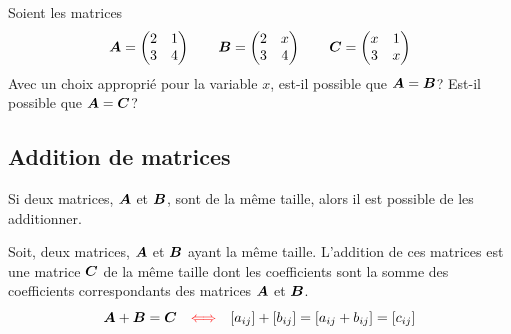 \begin{exerciceB}
Soient les matrices
    \[
    \boldsymbol{A} = \begin{pmatrix}
        2 & 1 \\
        3 & 4
        \end{pmatrix}
    \qquad
    \boldsymbol{B} = \begin{pmatrix}
        2 & x \\
        3 & 4
        \end{pmatrix}
        \qquad
    \boldsymbol{C} = \begin{pmatrix}
        x & 1 \\
        3 & x
        \end{pmatrix}
    \]
Avec un choix approprié pour la variable $x$, est-il possible que $\boldsymbol{A} =\boldsymbol{B}$?
Est-il possible que $\boldsymbol{A} = \boldsymbol{C}$?
\end{exerciceB}

\subsection{Addition de matrices}

Si deux matrices, $\boldsymbol{A}$ et $\boldsymbol{B}$, sont de la même taille, alors il est possible
de les additionner.  
\begin{defini}
Soit, deux matrices, $\boldsymbol{A}$ et $\boldsymbol{B}$ ayant la même taille.  L'addition de
ces matrices est une matrice $\boldsymbol{C}$ de la même taille dont les coefficients sont
la somme des coefficients correspondants des matrices $\boldsymbol{A}$ et $\boldsymbol{B}$.
\[
\boldsymbol{A} + \boldsymbol{B} = \boldsymbol{C} \quad {\color{red}\Longleftrightarrow} \quad [a_{ij}] + [b_{ij}] = [a_{ij} + b_{ij}] = [c_{ij}]
\]
\end{defini}

